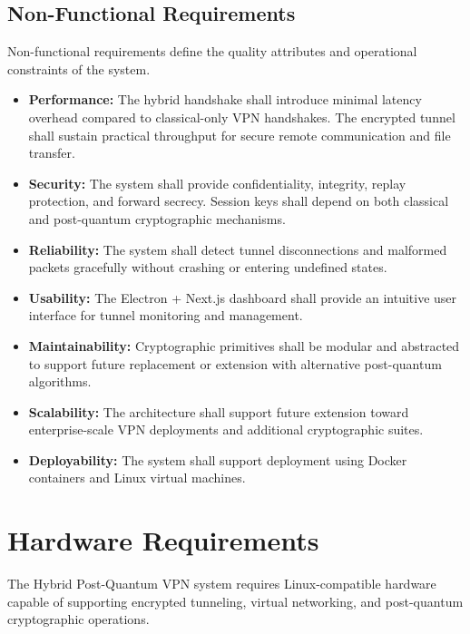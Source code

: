 \subsection{Non-Functional Requirements}

Non-functional requirements define the quality attributes and operational constraints of the system.

\begin{itemize}

    \item \textbf{Performance:} The hybrid handshake shall introduce minimal latency overhead compared to classical-only VPN handshakes. The encrypted tunnel shall sustain practical throughput for secure remote communication and file transfer.

    \item \textbf{Security:} The system shall provide confidentiality, integrity, replay protection, and forward secrecy. Session keys shall depend on both classical and post-quantum cryptographic mechanisms.

    \item \textbf{Reliability:} The system shall detect tunnel disconnections and malformed packets gracefully without crashing or entering undefined states.

    \item \textbf{Usability:} The Electron + Next.js dashboard shall provide an intuitive user interface for tunnel monitoring and management.

    \item \textbf{Maintainability:} Cryptographic primitives shall be modular and abstracted to support future replacement or extension with alternative post-quantum algorithms.

    \item \textbf{Scalability:} The architecture shall support future extension toward enterprise-scale VPN deployments and additional cryptographic suites.

    \item \textbf{Deployability:} The system shall support deployment using Docker containers and Linux virtual machines.

\end{itemize}

\section{Hardware Requirements}

The Hybrid Post-Quantum VPN system requires Linux-compatible hardware capable of supporting encrypted tunneling, virtual networking, and post-quantum cryptographic operations.

